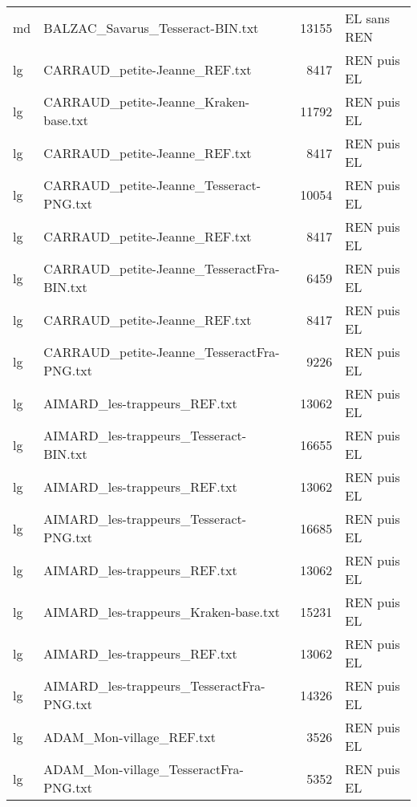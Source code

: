 \begin{tabular}{llrl}
    md &                   BALZAC\_Savarus\_Tesseract-BIN.txt &                 13155 & EL sans REN \\
    lg &                      CARRAUD\_petite-Jeanne\_REF.txt &                  8417 & REN puis EL \\
    lg &              CARRAUD\_petite-Jeanne\_Kraken-base.txt &                 11792 & REN puis EL \\
    lg &                      CARRAUD\_petite-Jeanne\_REF.txt &                  8417 & REN puis EL \\
    lg &            CARRAUD\_petite-Jeanne\_Tesseract-PNG.txt &                 10054 & REN puis EL \\
    lg &                      CARRAUD\_petite-Jeanne\_REF.txt &                  8417 & REN puis EL \\
    lg &         CARRAUD\_petite-Jeanne\_TesseractFra-BIN.txt &                  6459 & REN puis EL \\
    lg &                      CARRAUD\_petite-Jeanne\_REF.txt &                  8417 & REN puis EL \\
    lg &         CARRAUD\_petite-Jeanne\_TesseractFra-PNG.txt &                  9226 & REN puis EL \\
    lg &                       AIMARD\_les-trappeurs\_REF.txt &                 13062 & REN puis EL \\
    lg &             AIMARD\_les-trappeurs\_Tesseract-BIN.txt &                 16655 & REN puis EL \\
    lg &                       AIMARD\_les-trappeurs\_REF.txt &                 13062 & REN puis EL \\
    lg &             AIMARD\_les-trappeurs\_Tesseract-PNG.txt &                 16685 & REN puis EL \\
    lg &                       AIMARD\_les-trappeurs\_REF.txt &                 13062 & REN puis EL \\
    lg &               AIMARD\_les-trappeurs\_Kraken-base.txt &                 15231 & REN puis EL \\
    lg &                       AIMARD\_les-trappeurs\_REF.txt &                 13062 & REN puis EL \\
    lg &          AIMARD\_les-trappeurs\_TesseractFra-PNG.txt &                 14326 & REN puis EL \\
    lg &                           ADAM\_Mon-village\_REF.txt &                  3526 & REN puis EL \\
    lg &              ADAM\_Mon-village\_TesseractFra-PNG.txt &                  5352 & REN puis EL \\

\end{tabular}
